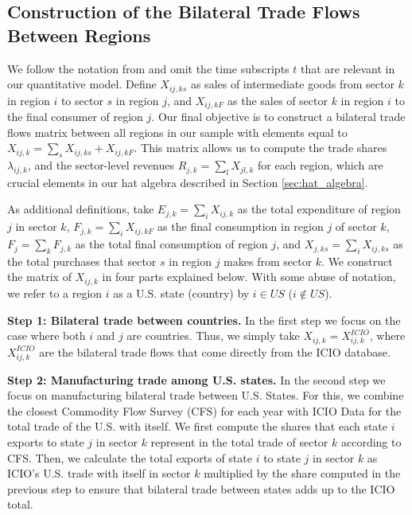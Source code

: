 \documentclass[12pt]{article}
\begin{document}
\subsection{Construction of the Bilateral Trade Flows Between Regions} \label{sec:appendix_data_bilat}

We follow the notation from \cite{Costinot2014} and omit the time subscripts $t$ that are relevant in our quantitative model. Define  $X_{ij,ks}$ as sales of intermediate goods from sector $k$ in region $i$ to sector $s$ in region $j$, and $X_{ij,kF}$ as the sales of sector $k$ in region $i$ to the final consumer of region $j$. Our final objective is to construct a bilateral trade flows matrix between all regions in our sample with elements equal to $X_{ij,k}=\sum_{s}X_{ij,ks}+X_{ij,kF}$. This matrix allows us to compute the trade shares $\lambda_{ij,k}$, and the sector-level revenues $R_{j,k}=\sum_{l}X_{jl,k}$ for each region, which are crucial elements in our hat algebra described in Section \ref{sec:hat_algebra}. 

As additional definitions, take $E_{j,k}=\sum_{i}X_{ij,k}$ as the total expenditure of region $j$ in sector $k$,  $F_{j,k}=\sum_{i}X_{ij,kF}$ as the final consumption in region $j$ of sector $k$, $F_{j}=\sum_{k}F_{j,k}$ as the total final consumption of region $j$, and $X_{j,ks}=\sum_{i}X_{ij,ks}$ as the total purchases that sector $s$ in region $j$ makes from sector $k$. We construct the matrix of $X_{ij,k}$ in four parts explained below. With some abuse of notation, we refer to a region $i$ as a U.S. state (country) by $i \in US$ ($i \notin US$). 

\textbf{Step 1: Bilateral trade between countries.} In the first step we focus on the case where both $i$ and $j$ are countries. Thus, we simply take $X_{ij,k}=X_{ij,k}^{ICIO}$, where $X_{ij,k}^{ICIO}$ are the bilateral trade flows that come directly from the ICIO database.

\textbf{Step 2: Manufacturing trade among U.S. states.} In the second step we focus on manufacturing bilateral trade between U.S. States. For this, we combine the closest Commodity Flow Survey (CFS) for each year with ICIO Data for the total trade of the U.S. with itself. We first compute the shares that each state $i$ exports to state $j$ in sector $k$ represent in the total trade of sector $k$ according to CFS. Then, we calculate the total exports of state $i$ to state $j$ in sector $k$ as ICIO's U.S. trade with itself in sector $k$ multiplied by the share computed in the previous step to ensure that bilateral trade between states adds up to the ICIO total.
\end{document}
